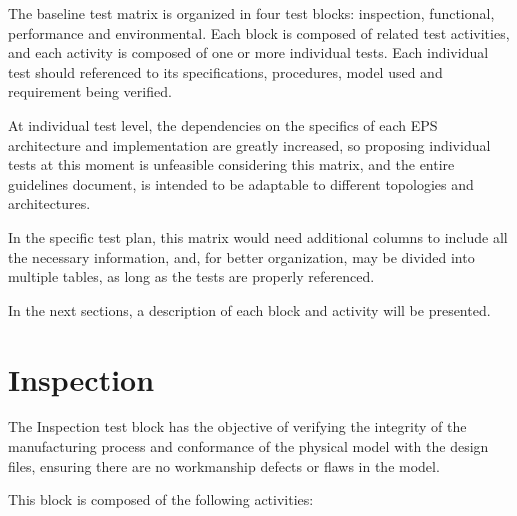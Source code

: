 The baseline test matrix is organized in four test blocks: inspection, functional, performance and environmental.
Each block is composed of related test activities, and each activity is composed of one or more individual tests.
Each individual test should referenced to its specifications, procedures, model used and requirement being verified.

At individual test level, the dependencies on the specifics of each EPS architecture and implementation are greatly increased, so proposing individual tests at this moment is unfeasible considering this matrix, and the entire guidelines document, is intended to be adaptable to different topologies and architectures.

In the specific test plan, this matrix would need additional columns to include all the necessary information, and, for better organization, may be divided into multiple tables, as long as the tests are properly referenced.

In the next sections, a description of each block and activity will be presented.



\section{Inspection}

The Inspection test block has the objective of verifying the integrity of the manufacturing process and conformance of the physical model with the design files, ensuring there are no workmanship defects or flaws in the model.

This block is composed of the following activities:

